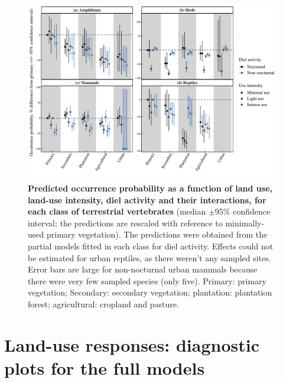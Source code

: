 \begin{figure}[h!]
\centering
\includegraphics[scale=0.7]{Supporting/Chapter4/Figures/Partial_models_predictions/Diel_activity}
\caption[Predicted occurrence probability as a function of land use, land-use intensity, diel activity and their interactions in each class]{\textbf{Predicted occurrence probability as a function of land use, land-use intensity, diel activity and their interactions, for each class of terrestrial vertebrates} (median $\pm$95\% confidence interval; the predictions are rescaled with reference to minimally-used primary vegetation). The predictions were obtained from the partial models fitted in each class for diel activity. Effects could not be estimated for urban reptiles, as there weren't any sampled sites. Error bars are large for non-nocturnal urban mammals because there were very few sampled species (only five).  Primary: primary vegetation; Secondary: secondary vegetation; plantation: plantation forest; agricultural: cropland and pasture.}
\label{SI_4_Figure11}
\end{figure}


\clearpage
\section{Land-use responses: diagnostic plots for the full models} 

